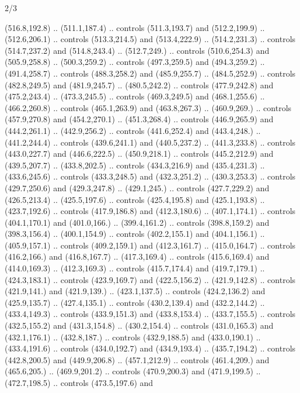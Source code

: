 \begin{flagdescription}{2/3}
\begin{scope}[xshift=0.5\flaglength,fill=white]
\begin{scope}[scale=0.00038\flagwidth,yshift=38.5mm,xshift=-705mm]
\begin{scope}[y=0.1mm, x=0.1mm, yscale=-1, xscale=1]
\begin{scope}[cm={{18.0964,0.0,0.0,17.21363,(246.63518,-8836.1551)}}]
  (516.8,192.8) .. (511.1,187.4) .. controls (511.3,193.7) and
  (512.2,199.9) .. (512.6,206.1) .. controls (513.3,214.5) and
  (513.4,222.9) .. (514.2,231.3) .. controls (514.7,237.2) and
  (514.8,243.4) .. (512.7,249.) .. controls (510.6,254.3) and
  (505.9,258.8) .. (500.3,259.2) .. controls (497.3,259.5) and
  (494.3,259.2) .. (491.4,258.7) .. controls (488.3,258.2) and
  (485.9,255.7) .. (484.5,252.9) .. controls (482.8,249.5) and
  (481.9,245.7) .. (480.5,242.2) .. controls (477.9,242.8) and
  (475.2,243.4) .. (473.3,245.5) .. controls (469.3,249.5) and
  (468.1,255.6) .. (466.2,260.8) .. controls (465.1,263.9) and
  (463.8,267.3) .. (460.9,269.) .. controls (457.9,270.8) and
  (454.2,270.1) .. (451.3,268.4) .. controls (446.9,265.9) and
  (444.2,261.1) .. (442.9,256.2) .. controls (441.6,252.4) and
  (443.4,248.) .. (441.2,244.4) .. controls (439.6,241.1) and
  (440.5,237.2) .. (441.3,233.8) .. controls (443.0,227.7) and
  (446.6,222.5) .. (450.9,218.1) .. controls (445.2,212.9) and
  (439.5,207.7) .. (433.8,202.5) .. controls (434.3,216.9) and
  (435.4,231.3) .. (433.6,245.6) .. controls (433.3,248.5) and
  (432.3,251.2) .. (430.3,253.3) .. controls (429.7,250.6) and
  (429.3,247.8) .. (429.1,245.) .. controls (427.7,229.2) and
  (426.5,213.4) .. (425.5,197.6) .. controls (425.4,195.8) and
  (425.1,193.8) .. (423.7,192.6) .. controls (417.9,186.8) and
  (412.3,180.6) .. (407.1,174.1) .. controls (404.1,170.1) and
  (401.0,166.) .. (399.4,161.2) .. controls (398.8,159.2) and
  (398.3,156.4) .. (400.1,154.9) .. controls (402.2,155.1) and
  (404.1,156.1) .. (405.9,157.1) .. controls (409.2,159.1) and
  (412.3,161.7) .. (415.0,164.7) .. controls (416.2,166.) and
  (416.8,167.7) .. (417.3,169.4) .. controls (415.6,169.4) and
  (414.0,169.3) .. (412.3,169.3) .. controls (415.7,174.4) and
  (419.7,179.1) .. (424.3,183.1) .. controls (423.9,169.7) and
  (422.5,156.2) .. (421.9,142.8) .. controls (421.9,141.) and
  (421.9,139.) .. (423.1,137.5) .. controls (424.2,136.2) and
  (425.9,135.7) .. (427.4,135.1) .. controls (430.2,139.4) and
  (432.2,144.2) .. (433.4,149.3) .. controls (433.9,151.3) and
  (433.8,153.4) .. (433.7,155.5) .. controls (432.5,155.2) and
  (431.3,154.8) .. (430.2,154.4) .. controls (431.0,165.3) and
  (432.1,176.1) .. (432.8,187.) .. controls (432.9,188.5) and
  (433.0,190.1) .. (433.4,191.6) .. controls (434.0,192.7) and
  (434.9,193.4) .. (435.7,194.2) .. controls (442.8,200.5) and
  (449.9,206.8) .. (457.1,212.9) .. controls (461.4,209.) and
  (465.6,205.) .. (469.9,201.2) .. controls (470.9,200.3) and
  (471.9,199.5) .. (472.7,198.5) .. controls (473.5,197.6) and

\end{scope}
\end{scope}
\end{scope}
\end{scope}
\end{flagdescription}
